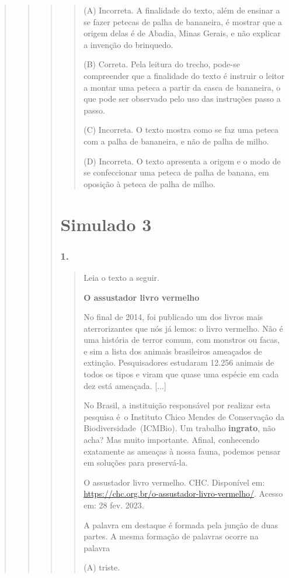 \begin{quote}
\begin{quote}
\begin{quote}
\begin{quote}
(A) Incorreta. A finalidade do texto, além de ensinar a se fazer petecas
de palha de bananeira, é mostrar que a origem delas é de Abadia, Minas
Gerais, e não explicar a invenção do brinquedo.

(B) Correta. Pela leitura do trecho, pode-se compreender que a
finalidade do texto é instruir o leitor a montar uma peteca a partir da
casca de bananeira, o que pode ser observado pelo uso das instruções
passo a passo.

(C) Incorreta. O texto mostra como se faz uma peteca com a palha de
bananeira, e não de palha de milho.

(D) Incorreta. O texto apresenta a origem e o modo de se confeccionar
uma peteca de palha de banana, em oposição à peteca de palha de milho.
\end{quote}

\section{Simulado 3}\label{simulado-3}

\subsubsection{1. }\label{section-88}

\begin{quote}
Leia o texto a seguir.

\textbf{O assustador livro vermelho}

No final de 2014, foi publicado um dos livros mais aterrorizantes que
nós já lemos: o livro vermelho. Não é uma história de terror comum, com
monstros ou facas, e sim a lista dos animais brasileiros ameaçados de
extinção. Pesquisadores estudaram 12.256 animais de todos os tipos e
viram que quase uma espécie em cada dez está ameaçada. {[}...{]}

No Brasil, a instituição responsável por realizar esta pesquisa é~o
Instituto Chico Mendes de Conservação da Biodiversidade~(ICMBio). Um
trabalho \textbf{ingrato}, não acha? Mas muito importante. Afinal,
conhecendo exatamente as ameaças à nossa fauna, podemos pensar em
soluções para preservá-la.

O assustador livro vermelho. CHC. Disponível em:
\url{https://chc.org.br/o-assustador-livro-vermelho/}. Acesso em: 28
fev. 2023.

A palavra em destaque é formada pela junção de duas partes. A mesma
formação de palavras ocorre na palavra

(A) triste.


\end{quote}
\end{quote}
\end{quote}
\end{quote}
